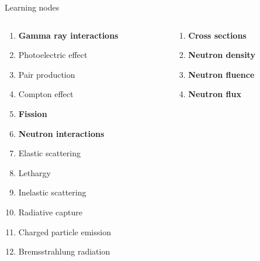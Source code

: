 \documentclass[aspectratio=1610,pdftex,dvipsnames,compress,xcolor={dvipsnames}]{beamer}
\begin{document}
\begin{frame}{Learning nodes}
    \begin{columns}[t]

        \begin{column}{0.50\textwidth}
            \begin{enumerate}[series=outerlist,topsep=0pt,itemsep=1pt,leftmargin=*,label=(\arabic*)]
                \item[]\textbf{Gamma ray interactions}
                \item[]Photoelectric effect
                \item[]Pair production
                \item[]Compton effect
                    \vspace{0.15in}
                \item[]\textbf{Fission}
                    \vspace{0.15in}
                \item[]\textbf{Neutron interactions}
                \item[]Elastic scattering
                \item[]Lethargy
                \item[]Inelastic scattering
                \item[]Radiative capture
                \item[]Charged particle emission
                \item[]Bremsstrahlung radiation
            \end{enumerate}
        \end{column}

        \begin{column}{0.50\textwidth}
            \begin{enumerate}[series=outerlist,topsep=0pt,itemsep=1pt,leftmargin=*,label=(\arabic*)]
                \item[]\hfill\textbf{Cross sections}
                    \vspace{0.15in}
                \item[]\hfill\textbf{Neutron density}
                    \vspace{0.15in}
                \item[]\hfill\textbf{Neutron fluence}
                    \vspace{0.15in}
                \item[]\hfill\textbf{Neutron flux}
            \end{enumerate}
        \end{column}

    \end{columns}
\end{frame}
\end{document}
